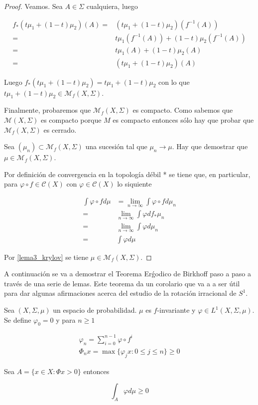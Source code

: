 \begin{proof}
	Veamos. Sea $A \in \Sigma$ cualquiera, luego 
	
	\begin{align}
	f_*(t\mu_1 + (1-t)\mu_2)(A) =& (t\mu_1 + (1-t)\mu_2)(f^{-1}(A))\\
	=& t\mu_1(f^{-1}(A)) + (1-t)\mu_2(f^{-1}(A))\\
	=& t\mu_1(A) + (1-t)\mu_2(A)\\
	=& (t\mu_1 + (1-t)\mu_2)(A)
	\end{align}
	
	Luego $f_*(t\mu_1 + (1-t)\mu_2) = t\mu_1 + (1-t)\mu_2$ con lo que $t\mu_1 + (1-t)\mu_2 \in \mathcal{M}_f(X,\Sigma)$.
	
	Finalmente, probaremos que $\mathcal{M}_f(X,\Sigma)$ es compacto. Como sabemos que $\mathcal{M}(X,\Sigma)$ es compacto porque $M$ es compacto entonces sólo hay que probar que $\mathcal{M}_f(X,\Sigma)$ es cerrado.
	
	Sea $(\mu_n) \subset \mathcal{M}_f(X,\Sigma)$ una sucesión tal que $\mu_n \rightarrow \mu$. Hay que demostrar que $\mu \in \mathcal{M}_f(X,\Sigma)$.
	
	Por definición de convergencia en la topología débil * se tiene que, en particular, para $\varphi \circ f \in \mathcal{C}(X)$ con $\varphi \in \mathcal{C}(X)$ lo siquiente
	
	\begin{align}
	\int \varphi \circ f d\mu &= \lim_{n \rightarrow \infty} \int \varphi \circ f d\mu_n\\
	=& \lim_{n \rightarrow \infty} \int \varphi df_*\mu_n\\
	=& \lim_{n \rightarrow \infty} \int \varphi d\mu_n\\
	=& \int \varphi d\mu
	\end{align}
	
	Por \ref{lema3_krylov} se tiene $\mu \in \mathcal{M}_f(X,\Sigma)$.
\end{proof}

A continuación se va a demostrar el Teorema Erǵodico de Birkhoff paso a paso a través de una serie de lemas. Este teorema da un corolario que va a a ser útil para dar algunas afirmaciones acerca del estudio de la rotación irracional de $S^1$.

\begin{lema}
	Sea $(X,\Sigma,\mu)$ un espacio de probabilidad. $\mu$ es $f$-invariante y $\varphi \in L^1(X,\Sigma,\mu)$. Se define $\varphi_0 = 0$ y para $n \geq 1$
	
	\begin{gather}
		\varphi_n = \sum_{i=0}^{n-1} \varphi \circ f^i\\
		\varPhi_n x = \max \{\varphi_j x : 0 \leq j \leq n\} \geq 0
	\end{gather}
	
	Sea $A = \{x \in X: \varPhi x > 0 \}$ entonces

	\begin{equation}
		\int_A \varphi d\mu \geq 0
	\end{equation}
\end{lema}


